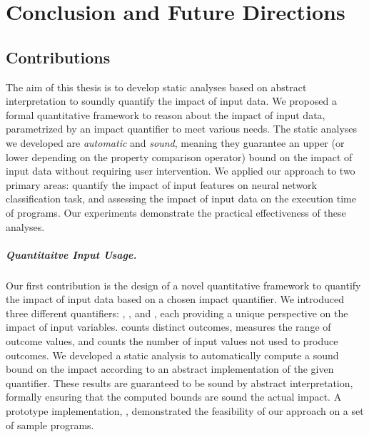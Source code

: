 

\chapter{Conclusion and Future Directions}

\section*{Contributions}


The aim of this thesis is to develop static analyses based on abstract interpretation to soundly quantify the impact of input data.
We proposed a formal quantitative framework to reason about the impact of input data, parametrized by an impact quantifier to meet various needs.
The static analyses we developed are \emph{automatic} and \emph{sound}, meaning they guarantee an upper (or lower depending on the property comparison operator) bound on the impact of input data without requiring user intervention.
We applied our approach to two primary areas: quantify the impact of input features on neural network classification task, and assessing the impact of input data on the execution time of programs.
Our experiments demonstrate the practical effectiveness of these analyses.

\paragraph{Quantitaitve Input Usage.} Our first contribution is the design of a novel quantitative framework to quantify the impact of input data based on a chosen impact quantifier.
We introduced three different quantifiers: \outcomesname{}, \rangename{}, and \qusedname{}, each providing a unique perspective on the impact of input variables.
\outcomesname{} counts distinct outcomes, \rangename{} measures the range of outcome values, and \qusedname{} counts the number of input values not used to produce outcomes.
We developed a static analysis to automatically compute a sound bound on the impact according to an abstract implementation of the given quantifier.
These results are guaranteed to be sound by abstract interpretation, formally ensuring that the computed bounds are sound \wrt{} the actual impact.
A prototype implementation, \impatto\sidenote{\impattourl}, demonstrated the feasibility of our approach on a set of sample programs.

